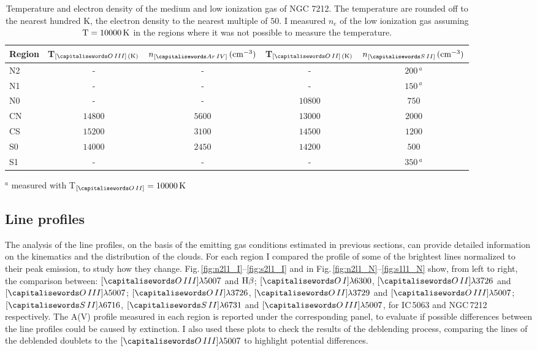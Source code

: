 \documentclass[../main.tex]{subfiles}
\begin{document}
\begin{table}
\caption[]{Temperature and electron density of the medium and low ionization gas of NGC 7212.
The temperature are rounded off to the nearest hundred K, the electron density to the nearest multiple of $50$. 
I measured $n_e$ of the low ionization gas assuming $\rm{T}=10000\,\si{K}$ in the regions where it was not possible to measure the temperature.}
\label{tab:ted_n}
\centering
\begin{threeparttable}
\begin{tabular}{lcccc}
\hline
Region&T$_{[\ion{O}{III}]\,(\si{K})}$&$n_{[\ion{Ar}{IV}]}\,(\si{cm^{-3}})$&T$_{[\ion{O}{II}]\,(\si{K})}$&$n_{[\ion{S}{II}]}\,(\si{cm^{-3}})$\\
\hline
N2&-&-&-&$200\,^a$\\
N1&-&-&-&$150\,^a$\\
N0&-&-&$10800$&$750$\\
CN&$14800$&$5600$&$13000$&$2000$\\
CS&$15200$&$3100$&$14500$&$1200$\\
S0&$14000$&$2450$&$14200$&$500$\\
S1&-&-&-&$350\,^a$\\
\hline
\end{tabular}
\begin{tablenotes}
\item $^a$ measured with T$_{[\ion{O}{II}]}= 10000\,\si{K}$
\end{tablenotes}
\end{threeparttable}
\end{table}

\subsection{Line profiles}
\label{sec:lineprof}

The analysis of the line profiles, on the basis of the emitting gas conditions estimated in previous sections, can provide detailed information on the kinematics and the distribution of the clouds.
For each region I compared the profile of some of the brightest lines normalized to their peak emission, to study how they change.
Fig.\,\ref{fig:n2l1_I}--\ref{fig:s2l1_I} and in Fig.\,\ref{fig:n2l1_N}--\ref{fig:s1l1_N} show, from left to right, the comparison between: $[\ion{O}{III}]\lambda5007$ and $\rm H\beta$; $[\ion{O}{I}]\lambda6300$, $[\ion{O}{II}]\lambda3726$ and $[\ion{O}{III}]\lambda5007$; $[\ion{O}{II}]\lambda3726$, $[\ion{O}{II}]\lambda3729$ and $[\ion{O}{III}]\lambda5007$; $[\ion{S}{II}]\lambda6716$, $[\ion{S}{II}]\lambda6731$ and $[\ion{O}{III}]\lambda5007$, for IC\,5063 and NGC\,7212 respectively.
The A(V) profile measured in each region is reported under the corresponding panel, to evaluate if possible differences between the line profiles could be caused by extinction.
I also used these plots to check the results of the deblending process, comparing the lines of the deblended doublets to the $[\ion{O}{III}]\lambda5007$ to highlight potential differences.
\end{document}
